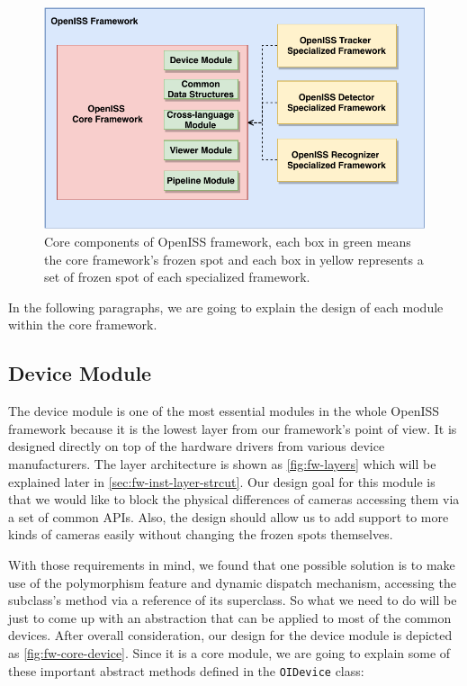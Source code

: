 \begin{figure}
    \includegraphics[width=\linewidth]{figures/framework_core_module.pdf}
    \caption[Core components of OpenISS framework]
    {Core components of OpenISS framework, each box in green means the core
    framework's frozen spot and each box in yellow represents a set of frozen
    spot of each specialized framework.}
    \label{fig:fw-core-module}
\end{figure}

In the following paragraphs, we are going to explain the design of each module 
within the core framework.

\subsection{Device Module}
\label{sec:fw-design-core-device}

The device module is one of the most essential modules in the whole OpenISS
framework because it is the lowest layer from our framework's point of view. 
It is designed directly on top of the hardware drivers from various device
manufacturers. The layer architecture is shown as \autoref{fig:fw-layers} 
which will be explained later in \autoref{sec:fw-inst-layer-strcut}.
Our design goal for this module is that we would like to block the physical
differences of cameras accessing them via a set of common APIs. Also, the
design should allow us to add support to more kinds of cameras easily without
changing the frozen spots themselves.

With those requirements in mind, we found that one possible solution is to make
use of the polymorphism feature and dynamic dispatch mechanism, accessing the
subclass's method via a reference of its superclass. So what we need to do
will be just to come up with an abstraction that can be applied to
most of the common devices. After overall consideration, our design for the device
module is depicted as \autoref{fig:fw-core-device}. Since it is a core module, we are
going to explain some of these important abstract methods defined
in the \texttt{OIDevice} class:

